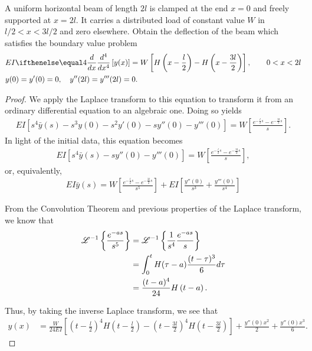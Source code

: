 \begin{problem}{4.32}
  A uniform horizontal beam of length $2l$ is clamped at the end $x=0$ and freely supported at $x=2l$.
  It carries a distributed load of constant value $W$ in $l/2 < x<3l/2$ and zero elsewhere. Obtain the deflection
  of the beam which satisfies the boundary value problem
  \begin{align*}
    & EI \der{x}{4}\left[y(x)\right] = W\left[H\left(x-\frac{l}{2}\right) - H\left(x-\frac{3l}{2}\right)\right], \qquad 0 < x < 2l \\
    & y(0) = y'(0) = 0, \quad y''(2l) = y'''(2l) = 0.
  \end{align*}
\end{problem}

\begin{proof}
  We apply the Laplace transform to this equation to transform it from an ordinary differential
  equation to an algebraic one. Doing so yields
  \begin{align*}
    EI\left[s^4 \bar{y}(s) - s^3y(0) - s^2 y'(0) - s y''(0) - y'''(0)\right] = W \left[\frac{e^{-\frac{l}{2}s} - e^{-\frac{3l}{2}s}}{s}\right].
  \end{align*}
  In light of the initial data, this equation becomes
  \begin{align*}
    EI\left[s^4 \bar{y}(s) - s y''(0) - y'''(0)\right] = W \left[\frac{e^{-\frac{l}{2}s} - e^{-\frac{3l}{2}s}}{s}\right],
  \end{align*}
  or, equivalently,
  \begin{align*}
    EI \bar{y}(s) = W \left[\frac{e^{-\frac{l}{2}s} - e^{-\frac{3l}{2}s}}{s^5}\right] + EI\left[\frac{y''(0)}{s^3} + \frac{y'''(0)}{s^4}\right]
  \end{align*}

  From the Convolution Theorem and previous properties of the Laplace transform, we know that
  \begin{align*}
    \mathscr{L}^{-1}\left\{ {\frac{e^{-as}}{s^5}} \right\} &= \mathscr{L}^{-1}\left\{ {\frac{1}{s^4}\frac{e^{-as}}{s}} \right\} \\
    &= \int_0^tH(\tau-a)\frac{(t-\tau)^3}{6}d\tau \\
    &= \frac{(t-a)^4}{24}H\left(t- a\right).
  \end{align*}

  Thus, by taking the inverse Laplace transform, we see that
  \begin{align*}
    y(x) &= \frac{W}{24 EI} \left[\left(t-\frac{l}{2}\right)^4H\left(t- \frac{l}{2}\right) - \left(t-\frac{3l}{2}\right)^4H\left(t- \frac{3l}{2}\right)\right] + \frac{y''(0)x^2}{2} + \frac{y''(0)x^3}{6}.
  \end{align*}


\end{proof}
